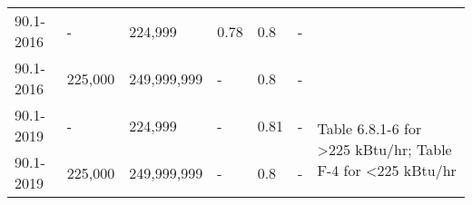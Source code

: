 \begin{table}
\begin{tabular}{|p{0.5in}|p{0.5in}|p{0.5in}|p{0.5in}|p{0.5in}|p{0.5in}|p{1.5in}|}
90.1-2016           & -           & 224,999       & 0.78 & 0.8 & -   &                                          \\ \cline{1-6}
90.1-2016           & 225,000     & 249,999,999   & -    & 0.8 & -   &                                          \\ \hline
90.1-2019           &  -          & 224,999       & -    & 0.81 &
  - &
  \multirow{2}{*}{\parbox{1.5in}{Table   6.8.1-6 for \textgreater 225 kBtu/hr; Table F-4 for \textless 225 kBtu/hr}} \\ \cline{1-6}
90.1-2019           & 225,000     & 249,999,999   & -    & 0.8 & -   &                                          \\ \hline
\end{tabular}
\end{table}